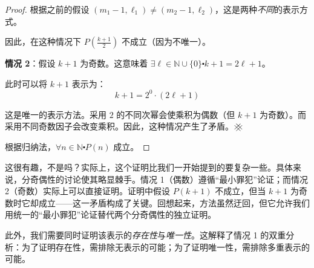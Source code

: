 \begin{example}[将自然数唯一地表示为乘积]
\begin{proof}
        根据之前的假设 $(m_1-1, \ell_1) \ne (m_2-1, \ell_2)$，这是两种\emph{不同}的表示方式。

        因此，在这种情况下 $P(\frac{k+1}{2})$ 不成立（因为不唯一）。

        \textbf{情况 2}：假设 $k+1$ 为奇数。这意味着 $\exists \ell \in \mathbb{N} \cup \{0\} \centerdot k+1 = 2\ell + 1$。
        
        此时可以将 $k+1$ 表示为：
        \[k+1 = 2^0 \cdot (2\ell + 1)\]

        这是唯一的表示方法。采用 $2$ 的不同次幂会使乘积为偶数（但 $k+1$ 为奇数）。而采用不同奇数因子会改变乘积。因此，这种情况产生了矛盾。$\hashx$

        根据归纳法，$\forall n \in \mathbb{N} \centerdot P(n)$ 成立。
    \end{proof}
\end{example}

这很有趣，不是吗？实际上，这个证明比我们一开始提到的要复杂一些。具体来说，分奇偶性的讨论使其略显棘手。情况 1（偶数）遵循``最小罪犯''论证；而情况 2（奇数）实际上可以直接证明。证明中假设 $P(k+1)$ 不成立，但当 $k+1$ 为奇数时它却成立——这一矛盾构成了关键。回想起来，方法虽然迂回，但它允许我们用统一的``最小罪犯''论证替代两个分奇偶性的独立证明。

此外，我们需要同时证明该表示的\emph{存在性}与\emph{唯一性}。这解释了情况 1 的双重分析：为了证明存在性，需排除无表示的可能；为了证明唯一性，需排除多重表示的可能。
